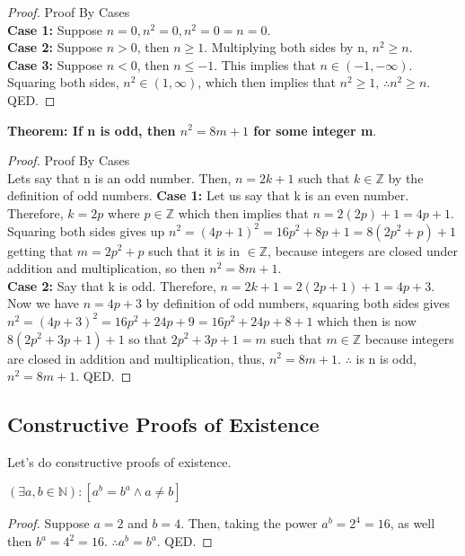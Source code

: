 \begin{proof}
    Proof By Cases\\
    \textbf{Case 1:} Suppose $n=0, n^2=0, n^2=0=n=0$. \\
    \textbf{Case 2:} Suppose $n>0$, then $n \geq 1$. Multiplying both sides by n, $n^2 \geq n$.\\
    \textbf{Case 3:} Suppose $n<0$, then $n \leq -1$. This implies that $n \in (-1, -\infty)$. Squaring both sides, $n^2 \in (1, \infty)$, which then implies that $n^2 \geq 1$, $\therefore n^2 \geq n$. QED.
\end{proof}

\begin{example}
    \textbf{Theorem: If n is odd, then $n^2=8m+1$ for some integer m}.
\end{example}

\begin{proof}
    Proof By Cases\\
    Lets say that n is an odd number. Then, $n=2k+1$ such that $k \in \mathbb{Z}$ by the definition of odd numbers.
    \textbf{Case 1:} Let us say that k is an even number. Therefore, $k=2p$ where $p \in \mathbb{Z}$ which then implies that $n=2(2p)+1=4p+1$. Squaring both sides gives up $n^2=(4p+1)^2=16p^2+8p+1=8(2p^2+p)+1$ getting that $m=2p^2+p$ such that it is in $\in \mathbb{Z}$, because integers are closed under addition and multiplication, so then $n^2=8m+1$.\\
    \textbf{Case 2:} Say that k is odd. Therefore, $n=2k+1=2(2p+1)+1=4p+3$. Now we have $n=4p+3$ by definition of odd numbers, squaring both sides gives $n^2=(4p+3)^2=16p^2+24p+9=16p^2+24p+8+1$ which then is now $8(2p^2+3p+1)+1$ so that $2p^2+3p+1=m$ such that $m \in \mathbb{Z}$ because integers are closed in addition and multiplication, thus, $n^2=8m+1$. $\therefore$ is n is odd, $n^2=8m+1$. QED.
    
\end{proof}

\subsection{Constructive Proofs of Existence}
Let's do constructive proofs of existence.

\begin{example}
    $(\exists a,b \in \mathbb{N}) : [a^b = b^a \land a \neq b]$
\end{example}

\begin{proof}
Suppose $a=2$ and $b=4$. Then, taking the power $a^b=2^4=16$, as well then $b^a=4^2=16$. $\therefore a^b=b^a$. QED.
\end{proof}

